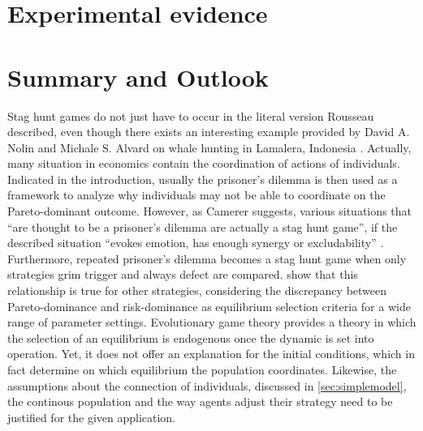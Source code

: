 \documentclass[11pt]{article}
\begin{document}
\section{Experimental evidence}
%
%

%
%
%
\section{Summary and Outlook}
Stag hunt games do not just have to occur in the literal version Rousseau
described, even though there exists an interesting example provided by 
David A. Nolin and Michale S. Alvard on whale hunting in Lamalera, Indonesia
\parencite{nolin_meat-sharing_2000}.
Actually, many situation in economics contain the coordination of actions
of individuals. 
Indicated in the introduction, usually the prisoner's dilemma is then used
as a framework to analyze why individuals may not be able to coordinate on the 
Pareto-dominant outcome. However, as Camerer
suggests, various situations that ``are thought to be a prisoner's dilemma 
are actually a stag hunt game'', if the described situation ``evokes emotion,
has enough synergy or excludability'' 
\parencite[376-377]{camerer_behavioral_2003}. Furthermore, repeated prisoner's
dilemma becomes a stag hunt game when only strategies grim trigger
and always defect are compared. \textcite{blonski_prisoners_2003} show that
this relationship is true for other strategies, considering the discrepancy
between Pareto-dominance and risk-dominance as equilibrium selection criteria 
for a wide range of parameter settings. 
Evolutionary game theory provides a theory in which the selection of an
equilibrium is endogenous once the dynamic is set into operation. Yet, it
does not offer an explanation for the initial conditions, which in fact 
determine on which equilibrium the population coordinates. Likewise, the
assumptions about the connection of individuals, discussed in 
\ref{sec:simplemodel}, the continous population and the way agents
adjust their strategy need to be justified for the given application. 
\end{document}
